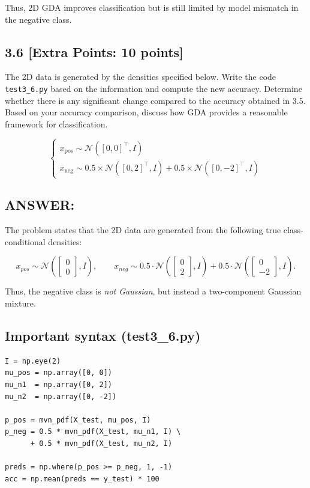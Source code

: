 \documentclass[12pt]{article}
\begin{document}
Thus, 2D GDA improves classification but is still limited by model mismatch in the negative class.


\subsection*{3.6 [Extra Points: 10 points]}
The 2D data is generated by the densities specified below. Write the code \texttt{test3\_6.py} based on the information and compute the new accuracy. Determine whether there is any significant change compared to the accuracy obtained in 3.5. Based on your accuracy comparison, discuss how GDA provides a reasonable framework for classification.

\[
\begin{cases}
x_{\text{pos}} \sim \mathcal{N}([0, 0]^\top, I) \\[0.3em]
x_{\text{neg}} \sim 0.5 \times \mathcal{N}([0, 2]^\top, I)
                + 0.5 \times \mathcal{N}([0, -2]^\top, I)
\end{cases}
\]

\subsection*{ANSWER:}
The problem states that the 2D data are generated from the following true class-conditional
densities:

\[
x_{pos} \sim \mathcal{N}\!\left(\begin{bmatrix}0 \\ 0\end{bmatrix}, I\right), \qquad
x_{neg} \sim 0.5 \cdot 
\mathcal{N}\!\left(\begin{bmatrix}0 \\ 2\end{bmatrix}, I\right)
+
0.5 \cdot 
\mathcal{N}\!\left(\begin{bmatrix}0 \\ -2\end{bmatrix}, I\right).
\]

Thus, the negative class is \emph{not Gaussian}, but instead a two-component Gaussian mixture.

\subsection*{Important syntax (test3\_6.py)}
\begin{lstlisting}
I = np.eye(2)
mu_pos = np.array([0, 0])
mu_n1  = np.array([0, 2])
mu_n2  = np.array([0, -2])

p_pos = mvn_pdf(X_test, mu_pos, I)
p_neg = 0.5 * mvn_pdf(X_test, mu_n1, I) \
      + 0.5 * mvn_pdf(X_test, mu_n2, I)

preds = np.where(p_pos >= p_neg, 1, -1)
acc = np.mean(preds == y_test) * 100
\end{lstlisting}
\end{document}
